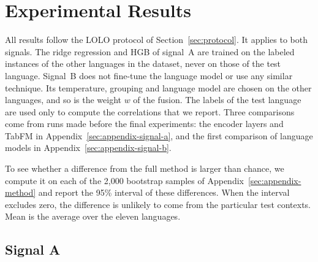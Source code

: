 \documentclass[11pt]{article}
\begin{document}
\section{Experimental Results}
\label{sec:results}

All results follow the LOLO protocol of Section~\ref{sec:protocol}. It applies to both signals. %
The ridge regression and HGB of signal~A are trained on the labeled instances of the other %
languages in the dataset, never on those of the test language. Signal~B does not fine-tune the
language model or use any similar technique. Its temperature, grouping and language model are %
chosen on the other languages, and so is the weight $w$ of the fusion. The %
labels of the test language are used only to compute the correlations that we report. Three
comparisons come from runs made before the final experiments: the encoder layers and TabFM in
Appendix~\ref{sec:appendix-signal-a}, and the first comparison of language models in
Appendix~\ref{sec:appendix-signal-b}.

To see whether a difference from the full method is larger than chance, we compute it on each of %
the 2{,}000 bootstrap samples of Appendix~\ref{sec:appendix-method} and report the 95\% interval of these
differences. When the interval excludes zero, the difference is unlikely to come from the particular
test contexts. Mean is the average over the eleven languages.

\subsection{Signal A}
\label{sec:results-a}
\end{document}
